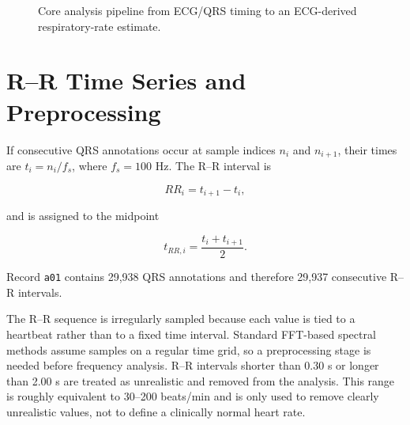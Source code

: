 \documentclass[a4paper,10.5pt,oneside]{report}
\begin{document}
\begin{figure}[H]
\centering
{}
\caption{Core analysis pipeline from ECG/QRS timing to an ECG-derived
respiratory-rate estimate.}
\label{fig:pipeline}
\end{figure}

\section{R--R Time Series and Preprocessing}

If consecutive QRS annotations occur at sample indices $n_i$ and $n_{i+1}$,
their times are $t_i=n_i/f_s$, where $f_s=100$ Hz. The R--R interval is

\begin{equation}
    RR_i=t_{i+1}-t_i,
    \label{eq:rr}
\end{equation}

and is assigned to the midpoint

\begin{equation}
    t_{RR,i}=\frac{t_i+t_{i+1}}{2}.
    \label{eq:rrtime}
\end{equation}

Record \texttt{a01} contains 29,938 QRS annotations and therefore 29,937
consecutive R--R intervals.

The R--R sequence is irregularly sampled because each value is tied to a heartbeat rather than to a fixed time interval. Standard FFT-based spectral
methods assume samples on a regular time grid, so a preprocessing stage is
needed before frequency analysis. R--R intervals shorter than 0.30 s or longer than 2.00 s are treated as unrealistic and removed from the analysis. This range is roughly equivalent to 30--200 beats/min and is only used to remove clearly unrealistic values, not to define a clinically normal heart rate.
\end{document}
